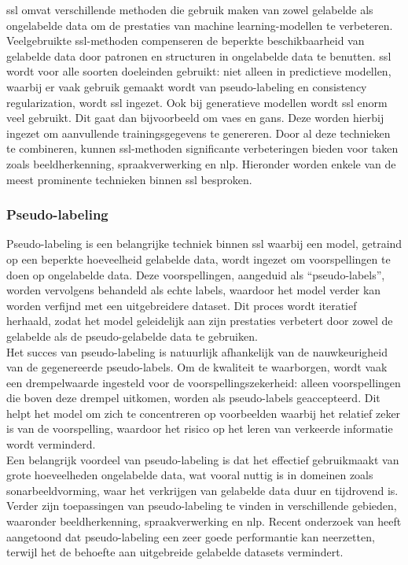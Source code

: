 \acrfull{ssl} omvat verschillende methoden die gebruik maken van zowel gelabelde als ongelabelde data om de prestaties van machine learning-modellen te verbeteren. Veelgebruikte \gls{ssl}-methoden compenseren de beperkte beschikbaarheid van gelabelde data door patronen en structuren in ongelabelde data te benutten. \gls{ssl} wordt voor alle soorten doeleinden gebruikt: niet alleen in predictieve modellen, waarbij er vaak gebruik gemaakt wordt van pseudo-labeling en consistency regularization, wordt \gls{ssl} ingezet. Ook bij generatieve modellen wordt \gls{ssl} enorm veel gebruikt. Dit gaat dan bijvoorbeeld om \glspl{vae} en \glspl{gan}. Deze worden hierbij ingezet om aanvullende trainingsgegevens te genereren. Door al deze technieken te combineren, kunnen \gls{ssl}-methoden significante verbeteringen bieden voor taken zoals beeldherkenning, spraakverwerking en \gls{nlp}. \autocite{van_Engelen_2019} Hieronder worden enkele van de meest prominente technieken binnen \gls{ssl} besproken.

\subsubsection{Pseudo-labeling}

Pseudo-labeling is een belangrijke techniek binnen \gls{ssl} waarbij een model, getraind op een beperkte hoeveelheid gelabelde data, wordt ingezet om voorspellingen te doen op ongelabelde data. Deze voorspellingen, aangeduid als ``pseudo-labels'', worden vervolgens behandeld als echte labels, waardoor het model verder kan worden verfijnd met een uitgebreidere dataset. Dit proces wordt iteratief herhaald, zodat het model geleidelijk aan zijn prestaties verbetert door zowel de gelabelde als de pseudo-gelabelde data te gebruiken. \autocite{Lee_2013} \\

Het succes van pseudo-labeling is natuurlijk afhankelijk van de nauwkeurigheid van de gegenereerde pseudo-labels. Om de kwaliteit te waarborgen, wordt vaak een drempelwaarde ingesteld voor de voorspellingszekerheid: alleen voorspellingen die boven deze drempel uitkomen, worden als pseudo-labels geaccepteerd. Dit helpt het model om zich te concentreren op voorbeelden waarbij het relatief zeker is van de voorspelling, waardoor het risico op het leren van verkeerde informatie wordt verminderd. \autocite{Kage_2024} \\

Een belangrijk voordeel van pseudo-labeling is dat het effectief gebruikmaakt van grote hoeveelheden ongelabelde data, wat vooral nuttig is in domeinen zoals sonarbeeldvorming, waar het verkrijgen van gelabelde data duur en tijdrovend is. Verder zijn toepassingen van pseudo-labeling te vinden in verschillende gebieden, waaronder beeldherkenning, spraakverwerking en \gls{nlp}. \autocite{Min_2022} Recent onderzoek van \textcite{Ferreira_2023} heeft aangetoond dat pseudo-labeling een zeer goede performantie kan neerzetten, terwijl het de behoefte aan uitgebreide gelabelde datasets vermindert. \\

